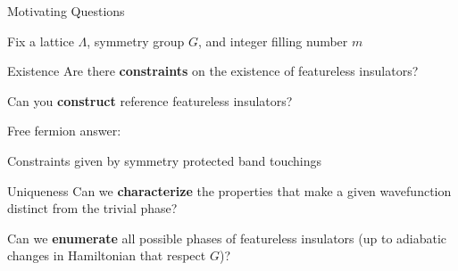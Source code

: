 \begin{frame}{Motivating Questions}
\vskip-1.5cm

Fix a lattice $\Lambda$, symmetry group $G$, and integer filling number $m$

\begin{block}{Existence}
Are there \textbf{constraints} on the existence of featureless insulators?

Can you \textbf{construct} reference featureless insulators? 



Free fermion answer: 
\bi
\item<2> Constraints given by symmetry protected band touchings 
\ei
\end{block}

\begin{block}{Uniqueness}
Can we \textbf{characterize} the properties that make a given wavefunction distinct from the trivial phase?

Can we \textbf{enumerate} all possible phases of featureless insulators (up to adiabatic changes in Hamiltonian that respect $G$)?


\end{block}
\end{frame}